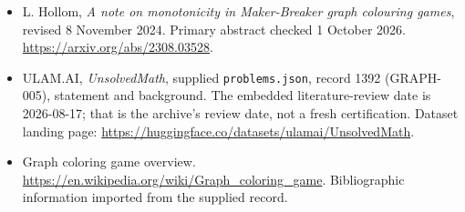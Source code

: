 \documentclass[11pt,a4paper]{article}
\begin{document}
{\small

\begin{itemize}
\item[E1] L. Hollom, \emph{A note on monotonicity in Maker-Breaker graph colouring games}, revised 8 November 2024. Primary abstract checked 1 October 2026. \url{https://arxiv.org/abs/2308.03528}.


\item[\hypertarget{source:1392:1}{S1}] ULAM.AI, \emph{UnsolvedMath}, supplied \texttt{problems.json}, record 1392 (GRAPH-005), statement and background. The embedded literature-review date is 2026-08-17; that is the archive’s review date, not a fresh certification. Dataset landing page: \url{https://huggingface.co/datasets/ulamai/UnsolvedMath}.

\item[\hypertarget{source:1392:2}{S2}] Graph coloring game overview. \url{https://en.wikipedia.org/wiki/Graph_coloring_game}. Bibliographic information imported from the supplied record.

\end{itemize}

}

\label{end:1392}
\end{document}
